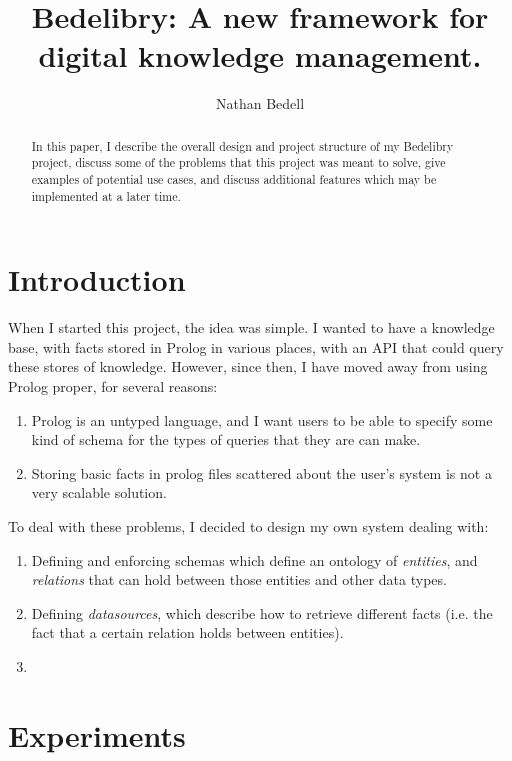 \documentclass{article}
\author{Nathan Bedell}
\title{Bedelibry: A new framework for digital knowledge management.}
\begin{document}
\maketitle

\begin{abstract}
  In this paper, I describe the overall design and project structure of my Bedelibry project, discuss some of the problems that this project was meant to solve, give examples of potential use cases, and discuss additional features which may be implemented at a later time.
\end{abstract}

\section{Introduction}

When I started this project, the idea was simple. I wanted to have a knowledge base, with facts stored in Prolog in various places, with an API that could query these stores of knowledge. However, since then, I have moved away from using Prolog proper, for several reasons:

\begin{enumerate}
    \item Prolog is an untyped language, and I want users to be able to specify some kind of schema for the types of queries that they are can make.
    \item Storing basic facts in prolog files scattered about the user's system is not a very scalable solution.
\end{enumerate}

\noindent To deal with these problems, I decided to design my own system dealing with:

\begin{enumerate}
    \item Defining and enforcing schemas which define an ontology of \textit{entities}, and \textit{relations} that can hold between those entities and other data types. 
    \item Defining \textit{datasources}, which describe how to retrieve different facts (i.e. the fact that a certain relation holds between entities).
    \item 
\end{enumerate}

\section{Experiments}
\end{document}
